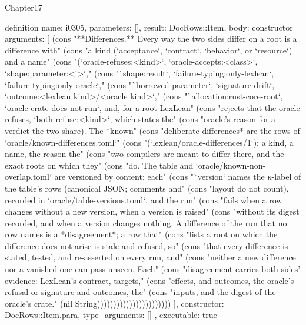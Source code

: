 \begin{lexlean}{Chapter17}
\begin{semanticmodule}
definition{
  name: i0305,
  parameters: [],
  result: DocRows::Item,
  body: constructor{
    arguments: [
      (cons "**Differences.** Every way the two sides differ on a root is a difference with" (cons "a kind (`acceptance`, `contract`, `behavior`, or `resource`) and a name" (cons "(`oracle-refuses:<kind>`, `oracle-accepts:<class>`, `shape:parameter:<i>`," (cons "`shape:result`, `failure-typing:only-lexlean`, `failure-typing:only-oracle`," (cons "`borrowed-parameter`, `signature-drift`, `outcome:<lexlean kind>/<oracle kind>`," (cons "`allocation:rust-core-root`, `oracle-crate-does-not-run`, and, for a root LexLean" (cons "rejects that the oracle refuses, `both-refuse:<kind>`, which states the" (cons "oracle's reason for a verdict the two share). The *known" (cons "deliberate differences* are the rows of `oracle/known-differences.toml`" (cons "(`lexlean/oracle-differences/1`): a kind, a name, the reason the" (cons "two compilers are meant to differ there, and the exact roots on which they" (cons "do. The table and `oracle/known-non-overlap.toml` are versioned by content: each" (cons "`version` names the κ-label of the table's rows (canonical JSON; comments and" (cons "layout do not count), recorded in `oracle/table-versions.toml`, and the run" (cons "fails when a row changes without a new version, when a version is raised" (cons "without its digest recorded, and when a version changes nothing. A difference of the run that no row names is a *disagreement*; a row that" (cons "lists a root on which the difference does not arise is stale and refused, so" (cons "that every difference is stated, tested, and re-asserted on every run, and" (cons "neither a new difference nor a vanished one can pass unseen. Each" (cons "disagreement carries both sides' evidence: LexLean's contract, targets," (cons "effects, and outcomes, the oracle's refusal or signature and outcomes, the" (cons "inputs, and the digest of the oracle's crate." (nil String)))))))))))))))))))))))
    ],
    constructor: DocRows::Item.para,
    type_arguments: []
  },
  executable: true
}


\end{semanticmodule}
\end{lexlean}
